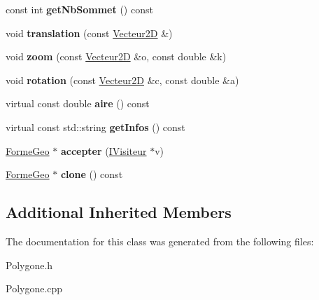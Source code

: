 \begin{DoxyCompactItemize}
\item 
\mbox{\label{class_polygone_aa3e2570d82f72447dae730a9504f0c89}} 
const int {\bfseries get\+Nb\+Sommet} () const
\item 
\mbox{\label{class_polygone_a6cdf232cb935415d1d8b0e0983ec4f31}} 
void {\bfseries translation} (const \mbox{\hyperlink{class_vecteur2_d}{Vecteur2D}} \&)
\item 
\mbox{\label{class_polygone_a99a5c6f6249b0b21e61d1cf4ba6c28db}} 
void {\bfseries zoom} (const \mbox{\hyperlink{class_vecteur2_d}{Vecteur2D}} \&o, const double \&k)
\item 
\mbox{\label{class_polygone_a348cebf6880677bc648c9743567b424c}} 
void {\bfseries rotation} (const \mbox{\hyperlink{class_vecteur2_d}{Vecteur2D}} \&c, const double \&a)
\item 
\mbox{\label{class_polygone_a6c7fbc4f5c8472c238ffddf33b21d5e6}} 
virtual const double {\bfseries aire} () const
\item 
\mbox{\label{class_polygone_af94b09b993d84fc451b772b8ead28144}} 
virtual const std\+::string {\bfseries get\+Infos} () const
\item 
\mbox{\label{class_polygone_a06a8b2d22059efe02ff62af2cf8c5a49}} 
\mbox{\hyperlink{class_forme_geo}{Forme\+Geo}} $\ast$ {\bfseries accepter} (\mbox{\hyperlink{class_i_visiteur}{I\+Visiteur}} $\ast$v)
\item 
\mbox{\label{class_polygone_a2cba3f4c141d1dc12dace56efa47b9ba}} 
\mbox{\hyperlink{class_forme_geo}{Forme\+Geo}} $\ast$ {\bfseries clone} () const
\end{DoxyCompactItemize}
\subsection*{Additional Inherited Members}


The documentation for this class was generated from the following files\+:\begin{DoxyCompactItemize}
\item 
Polygone.\+h\item 
Polygone.\+cpp\end{DoxyCompactItemize}
